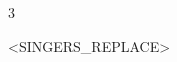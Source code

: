 \documentclass{article}[10pt]
\begin{document}
\begin{center}
\begin{minipage}{115mm}
\begin{center}
{                    \vspace{-0.1in}

                    \begin{multicols*}{3}
                        \begin{center}
                            \begin{footnotesize}
                                <SINGERS_REPLACE>
                            \end{footnotesize}
                        \end{center}
                    \end{multicols*}
                }
            \end{center}

        \end{minipage}
    \end{center}

    \pagebreak

\end{document}
